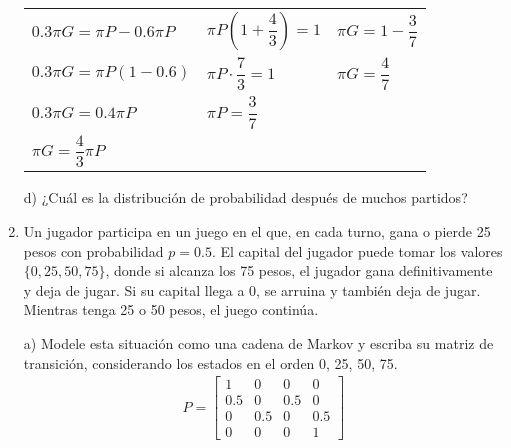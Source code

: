 \documentclass[a4paper, 12pt]{article}
\newcommand{\Aspace}{0.2cm}
\begin{document}
\begin{enumerate}
{\begin{flushleft}
\begin{tabular}{p{5cm} p{5cm} p{5cm}}
                        $0{.}3 \pi G = \pi P - 0{.}6 \pi P$ &
                        $\pi P (1 + \dfrac{4}{3}) = 1$ &
                        $\pi G = 1 - \dfrac{3}{7}$ \\

                        $0{.}3 \pi G = \pi P (1 - 0{.}6)$ &
                        $\pi P \cdot \dfrac{7}{3} = 1$ &
                        $\pi G = \dfrac{4}{7}$ \\

                        $0{.}3 \pi G = 0{.}4 \pi P$ &
                        $\pi P = \dfrac{3}{7}$ &
                        \\

                        $\pi G = \dfrac{4}{3} \pi P$ &
                        &
                        \\
                    \end{tabular}
                \end{flushleft}
            }

            \newpage
            \vspace{\Aspace} \par
            d) ¿Cuál es la distribución de probabilidad después de muchos partidos?
            \\ { \color{azul}  }

        
        \newpage
    \item Un jugador participa en un juego en el que, en cada turno, gana o pierde 25 pesos con probabilidad $p = 0{.}5$. El capital del jugador puede tomar los valores $\{0, 25, 50, 75\}$, donde si alcanza los 75 pesos, el jugador gana definitivamente y deja de jugar. Si su capital llega a 0, se arruina y también deja de jugar. Mientras tenga 25 o 50 pesos, el juego continúa.
            \vspace{\Aspace} \par
            a) Modele esta situación como una cadena de Markov y escriba su matriz de transición, considerando los estados en el orden 0, 25, 50, 75.
            \\ { \color{azul} 
                \[
                    \begin{array}{ccc}
                        P

                        =

                        \begin{bmatrix}
                            1       &   0       &   0       &   0       \\
                            0{.}5   &   0       &   0{.}5   &   0       \\
                            0       &   0{.}5   &   0       &   0{.}5   \\
                            0       &   0       &   0       &   1
                        \end{bmatrix}
                    \end{array}
                \]
            }


\end{enumerate}
\end{document}
